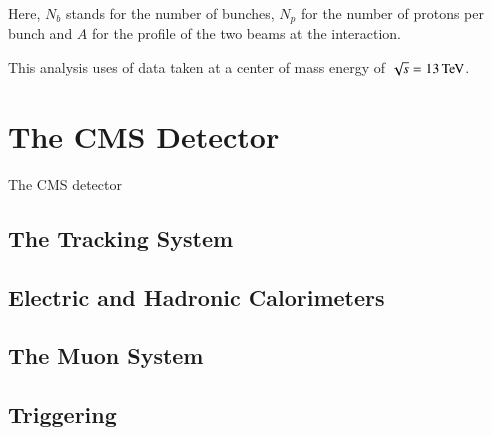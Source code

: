 Here, $N_b$ stands for the number of bunches, $N_p$ for the number of protons per bunch and $A$ for the profile of the two beams at the interaction.

This analysis uses \lumiv of data taken at a center of mass energy of $\sqrt{s} = 13 \,\text{Te\hspace{-.08em}V}$.

\section{The CMS Detector}

The CMS  detector 

\subsection{The Tracking System}

\subsection{Electric and Hadronic Calorimeters}

\subsection{The Muon System}

\subsection{Triggering}


